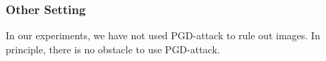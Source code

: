 \documentclass{llncs}
\begin{document}
%
%
%
%


%
%
%
%
%

\subsubsection*{Other Setting}

In our experiments, we have not used PGD-attack to rule out images. In principle, there is no obstacle to use PGD-attack.
\end{document}
